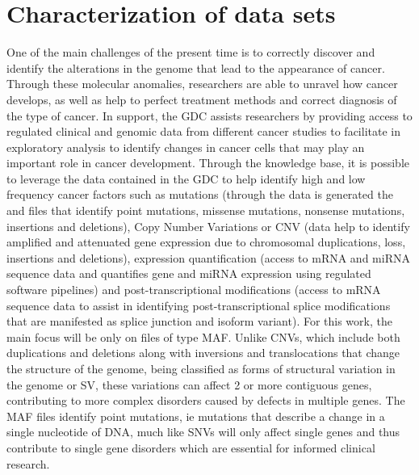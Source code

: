 
\chapter{Characterization of data sets}
\label{cha:general_characterization}

\hspace{10px} One of the main challenges of the present time is to correctly discover and identify the alterations in the genome that lead to the appearance of cancer. Through these molecular anomalies, researchers are able to unravel how cancer develops, as well as help to perfect treatment methods and correct diagnosis of the type of cancer. In support, the GDC assists researchers by providing access to regulated clinical and genomic data from different cancer studies to facilitate in exploratory analysis to identify changes in cancer cells that may play an important role in cancer development. Through the  knowledge base, it is possible to leverage the data contained in the GDC to help identify high and low frequency cancer factors such as mutations (through the data is generated the  and  files that identify point mutations, missense mutations, nonsense mutations, insertions and deletions), Copy Number Variations or CNV (data help to identify amplified and attenuated gene expression due to chromosomal duplications, loss, insertions and deletions), expression quantification (access to mRNA and miRNA sequence data and quantifies gene and miRNA expression using regulated software pipelines) and post-transcriptional modifications (access to mRNA sequence data to assist in identifying post-transcriptional splice modifications that are manifested as splice junction and isoform variant). For this work, the main focus will be only on files of type MAF. Unlike CNVs, which include both duplications and deletions along with inversions and translocations that change the structure of the genome, being classified as forms of structural variation in the genome or \gls{SV}, these variations can affect 2 or more contiguous genes, contributing to more complex disorders caused by defects in multiple genes\cite{Rebecca}. The MAF files identify point mutations, ie mutations that describe a change in a single nucleotide of DNA, much like SNVs will only affect single genes and thus contribute to single gene disorders which are essential for informed clinical research.





